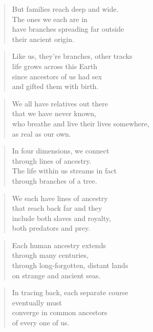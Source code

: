 \documentclass[10pt,a4paper]{article}
\begin{document}
\begin{paracol}{2}
\begin{verse}
But families reach deep and wide.\\
The ones we each are in\\
have branches spreading far outside\\
their ancient origin.
\end{verse}

\begin{verse}
Like us, they’re branches, other tracks\\
life grows across this Earth\\
since ancestors of us had sex\\
and gifted them with birth.
\end{verse}

\begin{verse}
We all have relatives out there\\
that we have never known,\\
who breathe and live their lives somewhere,\\
as real as our own.
\end{verse}

\begin{verse}
In four dimensions, we connect\\
through lines of ancestry.\\
The life within us streams in fact\\
through branches of a tree.
\end{verse}

\begin{verse}
We each have lines of ancestry\\
that reach back far and they\\
include both slaves and royalty,\\
both predators and prey.
\end{verse}

\begin{verse}
Each human ancestry extends\\
through many centuries,\\
through long-forgotten, distant lands\\
on strange and ancient seas.
\end{verse}

\begin{verse}
In tracing back, each separate course\\
eventually must\\
converge in common ancestors\\
of every one of us.
\end{verse}


\end{paracol}
\end{document}
